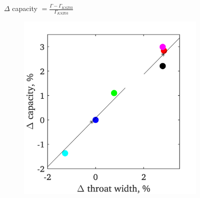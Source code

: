 \documentclass[a4paper, 11pt, oneside]{report}
\begin{document}
\begin{figure}[H]
	\centering
	$\Delta$ capacity $= \frac{\Gamma - \Gamma_{KSZ03}}{\Gamma_{KSZ03}}$
	\hspace{0.45cm}
	\begin{subfigure}{.45\textwidth}
		\centering
		\includegraphics[width=\linewidth]{figs/T900_2d_capacities_vs_throat_widths.png}
	\end{subfigure}
	\begin{subfigure}{.1125\textwidth}
		\centering

\end{subfigure}
\end{figure}
\end{document}
